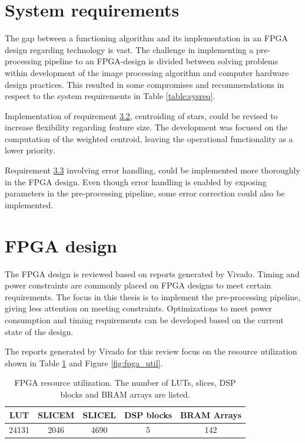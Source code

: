 \documentclass[12pt]{report}
\begin{document}
\section{System requirements}
The gap between a functioning algorithm and its implementation in an FPGA design regarding technology is vast. The challenge in implementing a pre-processing pipeline to an FPGA-design is divided between solving problems within development of the image processing algorithm and computer hardware design practices. This resulted in some compromises and recommendations in respect to the system requirements in Table \ref*{table:sysreq}.
\par
Implementation of requirement \hyperref[req3.2]{3.2}, centroiding of stars, could be revised to increase flexibility regarding feature size. The development was focused on the computation of the weighted centroid, leaving the operational functionality as a lower priority.
\par
Requirement \hyperref[req3.3]{3.3} involving error handling, could be implemented more thoroughly in the FPGA design. Even though error handling is enabled by exposing parameters in the pre-processing pipeline, some error correction could also be implemented.
\par

\section{FPGA design}
The FPGA design is reviewed based on reports generated by Vivado. Timing and power constraints are commonly placed on FPGA designs to meet certain requirements. The focus in this thesis is to implement the pre-processing pipeline, giving less attention on meeting constraints. Optimizations to meet power consumption and timing requirements can be developed based on the current state of the design.
\par
The reports generated by Vivado for this review focus on the resource utilization shown in Table \ref*{table:fpga_res} and Figure \ref*{fig:fpga_util}.

\begin{table}[h]
    \centering
    \begin{tabular}{|c|c|c|c|c|}
        \hline
        \textbf{LUT}& \textbf{SLICEM}& \textbf{SLICEL}& \textbf{DSP blocks}& \textbf{BRAM Arrays}\\
        \hline
        24131&2046&4690&5&142\\
        \hline
    \end{tabular}
    \caption{FPGA resource utilization. The number of LUTs, slices, DSP blocks and BRAM arrays are listed.}
    \label{table:fpga_res}
\end{table}
\end{document}
